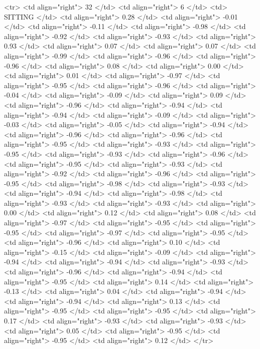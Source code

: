   <tr> <td align="right"> 32 </td> <td align="right">   6 </td> <td> SITTING </td> <td align="right"> 0.28 </td> <td align="right"> -0.01 </td> <td align="right"> -0.11 </td> <td align="right"> -0.98 </td> <td align="right"> -0.92 </td> <td align="right"> -0.93 </td> <td align="right"> 0.93 </td> <td align="right"> 0.07 </td> <td align="right"> 0.07 </td> <td align="right"> -0.99 </td> <td align="right"> -0.96 </td> <td align="right"> -0.96 </td> <td align="right"> 0.08 </td> <td align="right"> 0.00 </td> <td align="right"> 0.01 </td> <td align="right"> -0.97 </td> <td align="right"> -0.95 </td> <td align="right"> -0.96 </td> <td align="right"> -0.04 </td> <td align="right"> -0.09 </td> <td align="right"> 0.09 </td> <td align="right"> -0.96 </td> <td align="right"> -0.94 </td> <td align="right"> -0.94 </td> <td align="right"> -0.09 </td> <td align="right"> -0.03 </td> <td align="right"> -0.05 </td> <td align="right"> -0.94 </td> <td align="right"> -0.96 </td> <td align="right"> -0.96 </td> <td align="right"> -0.95 </td> <td align="right"> -0.93 </td> <td align="right"> -0.95 </td> <td align="right"> -0.93 </td> <td align="right"> -0.96 </td> <td align="right"> -0.95 </td> <td align="right"> -0.93 </td> <td align="right"> -0.92 </td> <td align="right"> -0.96 </td> <td align="right"> -0.95 </td> <td align="right"> -0.98 </td> <td align="right"> -0.93 </td> <td align="right"> -0.94 </td> <td align="right"> -0.98 </td> <td align="right"> -0.93 </td> <td align="right"> -0.93 </td> <td align="right"> 0.00 </td> <td align="right"> 0.12 </td> <td align="right"> 0.08 </td> <td align="right"> -0.97 </td> <td align="right"> -0.95 </td> <td align="right"> -0.95 </td> <td align="right"> -0.97 </td> <td align="right"> -0.95 </td> <td align="right"> -0.96 </td> <td align="right"> 0.10 </td> <td align="right"> -0.15 </td> <td align="right"> -0.09 </td> <td align="right"> -0.94 </td> <td align="right"> -0.94 </td> <td align="right"> -0.93 </td> <td align="right"> -0.96 </td> <td align="right"> -0.94 </td> <td align="right"> -0.95 </td> <td align="right"> 0.14 </td> <td align="right"> -0.13 </td> <td align="right"> 0.04 </td> <td align="right"> -0.94 </td> <td align="right"> -0.94 </td> <td align="right"> 0.13 </td> <td align="right"> -0.95 </td> <td align="right"> -0.95 </td> <td align="right"> 0.17 </td> <td align="right"> -0.93 </td> <td align="right"> -0.93 </td> <td align="right"> 0.05 </td> <td align="right"> -0.95 </td> <td align="right"> -0.95 </td> <td align="right"> 0.12 </td> </tr>

